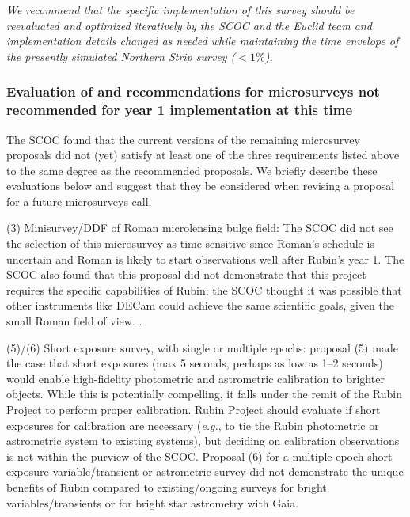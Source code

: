 \emph{We recommend that the specific implementation of this survey should be reevaluated and optimized iteratively by the SCOC and the Euclid team and implementation details changed as needed while maintaining the time envelope of the presently simulated Northern Strip survey ($<1\%$).}




\subsubsection{Evaluation of and recommendations for microsurveys not recommended for year 1 implementation at this time}

The SCOC found that the current versions of the remaining microsurvey proposals did not (yet) satisfy at least one of the three requirements listed above to the same degree as the recommended proposals. We briefly describe these evaluations below and suggest that they be considered when revising a proposal for a future microsurveys call.

(3) Minisurvey/DDF of Roman microlensing bulge field: The SCOC did not see the selection of this microsurvey as time-sensitive since Roman's schedule is uncertain and Roman is likely to start observations well after Rubin's year 1. The SCOC also found that this proposal did not demonstrate that this project requires the specific capabilities of Rubin: the SCOC thought it was possible that other instruments like DECam could achieve the same scientific goals, given the small Roman field of view. . 

(5)/(6) Short exposure survey, with single or multiple epochs: proposal (5) made the case that short exposures (max 5 seconds, perhaps as low as 1--2 seconds) would enable high-fidelity photometric and astrometric calibration to brighter objects. While this is potentially compelling, it falls under the remit of the Rubin Project to perform proper calibration. Rubin Project should evaluate if short exposures for calibration are necessary (\emph{e.g.}, to tie the Rubin photometric or astrometric system to existing systems), but deciding on calibration observations is not within the purview of the SCOC. Proposal (6) for a multiple-epoch short exposure variable/transient or astrometric survey did not demonstrate the unique benefits of Rubin compared to existing/ongoing surveys for bright variables/transients or for bright star astrometry with Gaia.

